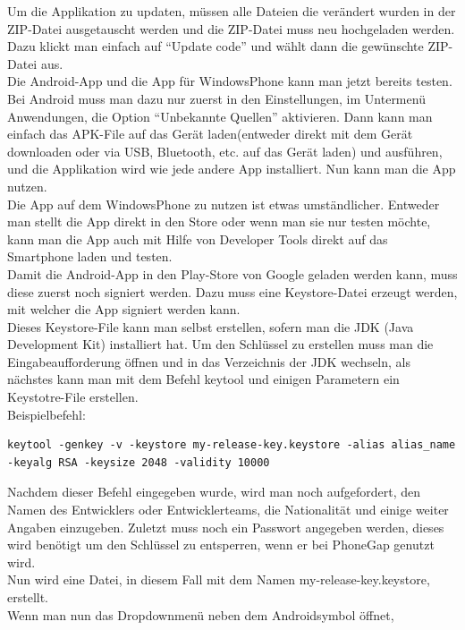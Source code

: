 Um die Applikation zu updaten, müssen alle Dateien die verändert wurden in der ZIP-Datei ausgetauscht werden und die ZIP-Datei muss neu hochgeladen werden. Dazu klickt man einfach auf \enquote{Update code} und wählt dann die gewünschte ZIP-Datei aus.\\
Die Android-App und die App für WindowsPhone kann man jetzt bereits testen. Bei Android muss man dazu nur zuerst in den Einstellungen, im Untermenü Anwendungen, die Option \enquote{Unbekannte Quellen} aktivieren. Dann kann man einfach das APK-File auf das Gerät laden(entweder direkt mit dem Gerät downloaden oder via USB, Bluetooth, etc. auf das Gerät laden) und ausführen, und die Applikation wird wie jede andere App installiert. Nun kann man die App nutzen.\\
Die App auf dem WindowsPhone zu nutzen ist etwas umständlicher. Entweder man stellt die App direkt in den Store oder wenn man sie nur testen möchte, kann man die App auch mit Hilfe von Developer Tools direkt auf das Smartphone laden und testen.\\
Damit die Android-App in den Play-Store von Google geladen werden kann, muss diese zuerst noch signiert werden. Dazu muss eine Keystore-Datei erzeugt werden, mit welcher die App signiert werden kann.\\
Dieses Keystore-File kann man selbst erstellen, sofern man die JDK (Java Development Kit) installiert hat. Um den Schlüssel zu erstellen muss man die Eingabeaufforderung öffnen und in das Verzeichnis der JDK wechseln, als nächstes kann man mit dem Befehl keytool und einigen Parametern ein Keystotre-File erstellen.\\
Beispielbefehl:\\

\begin{lstlisting}
keytool -genkey -v -keystore my-release-key.keystore -alias alias_name -keyalg RSA -keysize 2048 -validity 10000
\end{lstlisting}

Nachdem dieser Befehl eingegeben wurde, wird man noch aufgefordert, den Namen des Entwicklers oder Entwicklerteams, die Nationalität und einige weiter Angaben einzugeben. Zuletzt muss noch ein Passwort angegeben werden, dieses wird benötigt um den Schlüssel zu entsperren, wenn er bei PhoneGap genutzt wird.\\
Nun wird eine Datei, in diesem Fall mit dem Namen my-release-key.keystore, erstellt.\\
Wenn man nun das Dropdownmenü neben dem Androidsymbol öffnet,\\


